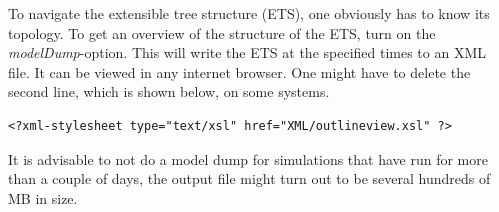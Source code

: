 \documentclass{article}
\begin{document}
\noindent To navigate the extensible tree structure (ETS), one obviously has to know its topology. To get an overview of the structure of the ETS, turn on the \textit{modelDump}-option. This will write the ETS at the specified times to an XML file. It can be viewed in any internet browser. One might have to delete the second line, which is shown below, on some systems.

\begin{verbatim}
<?xml-stylesheet type="text/xsl" href="XML/outlineview.xsl" ?>
\end{verbatim}

\noindent It is advisable to not do a model dump for simulations that have run for more than a couple of days, the output file might turn out to be several hundreds of MB in size.

%
%


%
\end{document}
